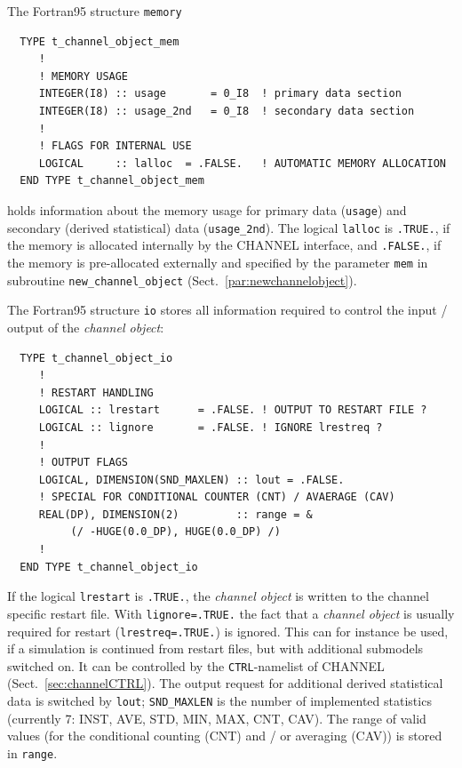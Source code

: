 \documentclass[twoside]{article}
\begin{document}
The Fortran95 structure {\tt memory}
\begin{verbatim}
  TYPE t_channel_object_mem
     !
     ! MEMORY USAGE
     INTEGER(I8) :: usage       = 0_I8  ! primary data section
     INTEGER(I8) :: usage_2nd   = 0_I8  ! secondary data section
     !
     ! FLAGS FOR INTERNAL USE
     LOGICAL     :: lalloc  = .FALSE.   ! AUTOMATIC MEMORY ALLOCATION
  END TYPE t_channel_object_mem
\end{verbatim}
holds information about the memory usage for primary data ({\tt usage}) and
secondary (derived statistical) data ({\tt usage\_2nd}). The logical
{\tt lalloc} is {\tt .TRUE.}, if the memory is allocated internally by
the CHANNEL interface, and {\tt .FALSE.}, if the memory is pre-allocated
externally and specified by the parameter {\tt mem} in subroutine
{\tt new\_channel\_object} (Sect.~\ref{par:newchannelobject}).

The Fortran95 structure {\tt io} stores all information required to control
the input / output of the {\it channel object}:
\begin{verbatim}
  TYPE t_channel_object_io
     !
     ! RESTART HANDLING
     LOGICAL :: lrestart      = .FALSE. ! OUTPUT TO RESTART FILE ?
     LOGICAL :: lignore       = .FALSE. ! IGNORE lrestreq ?
     !
     ! OUTPUT FLAGS
     LOGICAL, DIMENSION(SND_MAXLEN) :: lout = .FALSE.
     ! SPECIAL FOR CONDITIONAL COUNTER (CNT) / AVAERAGE (CAV)
     REAL(DP), DIMENSION(2)         :: range = &
          (/ -HUGE(0.0_DP), HUGE(0.0_DP) /)
     !
  END TYPE t_channel_object_io
\end{verbatim}
If the logical {\tt lrestart} is {\tt .TRUE.}, the {\it channel object} is
written to the channel specific restart file. With {\tt lignore=.TRUE.}
the fact that a {\it channel object} is usually required for restart
({\tt lrestreq=.TRUE.}) is ignored.
This can for instance be used, if a simulation is continued from restart files,
but with additional submodels switched on. It can be controlled by the
{\tt CTRL}-namelist of CHANNEL (Sect.~\ref{sec:channelCTRL}).
%
The output request for additional derived statistical data is switched by
{\tt lout}; {\tt SND\_MAXLEN} is the number of implemented statistics
(currently 7: INST, AVE, STD, MIN, MAX, CNT, CAV).
The range of valid values (for the conditional
counting (CNT) and / or averaging (CAV)) is stored in {\tt range}.
\end{document}
